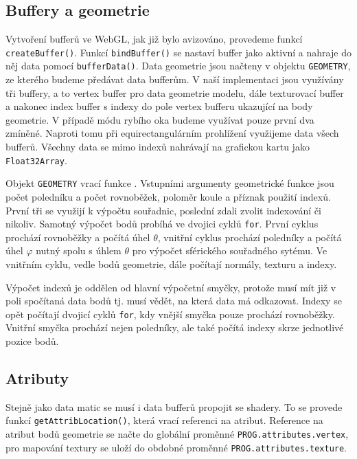 \newpage


\subsection{Buffery a geometrie}

Vytvoření bufferů ve WebGL, jak již bylo avizováno, provedeme funkcí \texttt{createBuffer()}. Funkcí   \texttt{bindBuffer()} se  nastaví buffer jako  aktivní  a  nahraje do něj  data  pomocí  \texttt{bufferData()}. Data geometrie jsou načteny v objektu \texttt{GEOMETRY},  ze kterého  budeme předávat data bufferům. V naší implementaci jsou využívány tři buffery, a to vertex buffer pro data geometrie modelu, dále texturovací buffer a nakonec index buffer s indexy do pole vertex bufferu ukazující na body geometrie. V případě módu rybího oka budeme využívat pouze první dva zmíněné. Naproti tomu při equirectangulárním prohlížení využijeme data všech bufferů. Všechny data se mimo indexů nahrávají na grafickou kartu jako \texttt{Float32Array}.


Objekt \texttt{GEOMETRY} vrací funkce \texttt{\createSphereGeometry}. Vstupními argumenty geometrické funkce jsou počet poledníku a počet rovnoběžek, poloměr koule a příznak použití indexů. První tři se využijí k výpočtu souřadnic, poslední zdali zvolit indexování či nikoliv. Samotný výpočet bodů probíhá ve dvojici cyklů \texttt{for}. První cyklus prochází rovnoběžky a počítá úhel $\theta$, vnitřní cyklus prochází poledníky a počítá úhel $\varphi$ nutný spolu s úhlem $\theta$ pro výpočet sférického souřadného sytému. Ve vnitřním cyklu, vedle bodů geometrie, dále počítají normály, texturu a indexy.


Výpočet indexů je oddělen od hlavní výpočetní smyčky, protože musí mít již v poli spočítaná data bodů tj. musí vědět, na která data má odkazovat. Indexy se opět počítají dvojicí cyklů \texttt{for}, kdy vnější smyčka pouze prochází rovnoběžky. Vnitřní smyčka prochází nejen poledníky, ale také počítá indexy skrze jednotlivé pozice bodů.

\subsection{Atributy}
Stejně jako data matic se musí i data bufferů propojit se shadery. To se provede funkcí \texttt{getAttribLocation()}, která vrací referenci na atribut. Reference na atribut bodů geometrie se načte   do globální proměnné \texttt{PROG.attributes.vertex}, pro mapování textury se uloží do obdobné proměnné \texttt{PROG.attributes.texture}.


